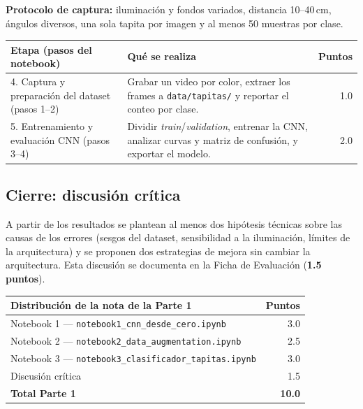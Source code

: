 \textbf{Protocolo de captura:} iluminación y fondos variados, distancia 10--40\,cm,
ángulos diversos, una sola tapita por imagen y al menos 50 muestras por clase.

\renewcommand{\arraystretch}{1.3}
\begin{tabularx}{\textwidth}{@{}p{6.2cm} X r@{}}
\toprule
\textbf{Etapa (pasos del notebook)} & \textbf{Qué se realiza} & \textbf{Puntos} \\
\midrule
4. Captura y preparación del dataset \newline (pasos 1--2)
  & Grabar un video por color, extraer los frames a \texttt{data/tapitas/} y reportar el conteo por clase.
  & 1.0 \\
5. Entrenamiento y evaluación CNN \newline (pasos 3--4)
  & Dividir \emph{train}/\emph{validation}, entrenar la CNN, analizar curvas y matriz de confusión, y exportar el modelo.
  & 2.0 \\
\bottomrule
\end{tabularx}
\renewcommand{\arraystretch}{1}

\subsection{Cierre: discusión crítica}

A partir de los resultados se plantean al menos dos hipótesis técnicas sobre las causas de
los errores (sesgos del dataset, sensibilidad a la iluminación, límites de la arquitectura)
y se proponen dos estrategias de mejora sin cambiar la arquitectura. Esta discusión se
documenta en la Ficha de Evaluación (\textbf{1.5 puntos}).

\begin{center}
\renewcommand{\arraystretch}{1.3}
\begin{tabular}{@{}lr@{}}
\toprule
\textbf{Distribución de la nota de la Parte 1} & \textbf{Puntos} \\
\midrule
Notebook 1 --- \texttt{notebook1\_cnn\_desde\_cero.ipynb}      & 3.0 \\
Notebook 2 --- \texttt{notebook2\_data\_augmentation.ipynb}    & 2.5 \\
Notebook 3 --- \texttt{notebook3\_clasificador\_tapitas.ipynb} & 3.0 \\
Discusión crítica                                              & 1.5 \\
\midrule
\textbf{Total Parte 1} & \textbf{10.0} \\
\bottomrule
\end{tabular}
\renewcommand{\arraystretch}{1}
\end{center}

